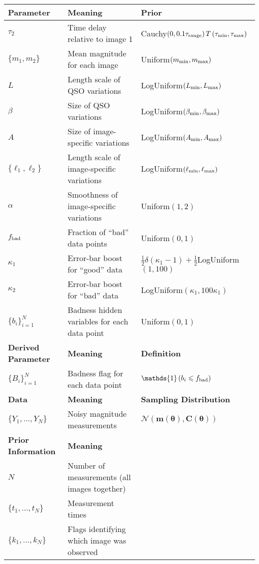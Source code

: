 \documentclass[useAMS,usenatbib, a4paper]{mn2e} \usepackage{natbib}
\newcommand{\params}{\boldsymbol{\theta}}
\begin{document}
\begin{table*}
\begin{tabular}{lll}
\hline
{\bf Parameter} &	{\bf Meaning}			& {\bf Prior}\\
\hline
$\tau_2$	&	Time delay relative to image 1	& Cauchy$\left(0, 0.1\tau_{\rm range}\right)T\left(\tau_{\rm min},\tau_{\rm max}\right)$\\
$\{m_1, m_2\}$	&	Mean magnitude for each image	& Uniform$(m_{\rm min}, m_{\rm max})$\\
$L$		&	Length scale of QSO variations	& LogUniform$(L_{\rm min}, L_{\rm max})$\\
$\beta$		&	Size of QSO variations		& LogUniform$(\beta_{\rm min}, \beta_{\rm max})$\\
$A$		&	Size of image-specific variations	& LogUniform$\left(A_{\rm min}, A_{\rm max}\right)$\\
$\{\ell_1, \ell_2\}$ &	Length scale of image-specific variations & LogUniform$(\ell_{\rm min}, \ell_{\rm max})$\\
$\alpha$	&	Smoothness of image-specific variations	& Uniform$(1, 2)$\\
$f_{\rm bad}$	&	Fraction of ``bad'' data points	& Uniform$(0,1)$\\
$\kappa_1$	&	Error-bar boost for ``good'' data & $\frac{1}{2}\delta(\kappa_1 - 1) + \frac{1}{2}$LogUniform$(1,100)$\\
$\kappa_2$	&	Error-bar boost for ``bad'' data & LogUniform$(\kappa_1, 100\kappa_1)$\\
$\{b_i\}_{i=1}^N$ &	Badness hidden variables for each data point & Uniform$(0,1)$\\
\hline
{\bf Derived Parameter} & {\bf Meaning}	&	{\bf Definition}\\
\hline
$\{B_i\}_{i=1}^N$	&	Badness flag for each data point & $\mathds{1}\left(b_i \leq f_{\rm bad}\right)$\\
\hline
{\bf Data}	&	{\bf Meaning}			& {\bf Sampling Distribution}\\
\hline
$\{Y_1, ..., Y_N\}$ &	Noisy magnitude measurements	& $\mathcal{N}\left(\mathbf{m}(\params), \mathbf{C}(\params)\right)$\\
\hline
{\bf Prior Information} & {\bf Meaning}			&\\
\hline
$N$		&	Number of measurements (all images together)\\
$\{t_1, ..., t_N\}$ &	Measurement times\\
$\{k_1, ..., k_N\}$ &	Flags identifying which image was observed
\end{tabular}
\end{table*}
\end{document}
